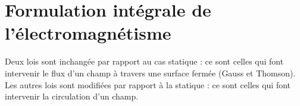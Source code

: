 \documentclass[12pt,fancy]{cours}
\begin{document}


\section{Formulation intégrale de l’électromagnétisme}

Deux lois sont inchangée par rapport au cas statique : ce sont celles qui font intervenir le flux d'un champ à travers une surface fermée (Gauss et Thomson). Les autres lois sont modifiées par rapport à la statique : ce sont celles qui font intervenir la circulation d'un champ.
\end{document}
